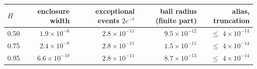 \begin{tabular}{@{}lrrrr@{}}\toprule
$H$ & enclosure width & exceptional events $2e^{-t}$ & ball radius (finite part) & alias, truncation\\\midrule
0.50 & $1.9\times10^{-6}$ & $2.8\times10^{-11}$ & $9.5\times10^{-12}$ & $\le$ $4\times10^{-14}$\\
0.75 & $2.4\times10^{-8}$ & $2.8\times10^{-11}$ & $1.5\times10^{-11}$ & $\le$ $4\times10^{-14}$\\
0.95 & $6.6\times10^{-10}$ & $2.8\times10^{-11}$ & $8.7\times10^{-13}$ & $\le$ $4\times10^{-14}$\\
\bottomrule\end{tabular}
